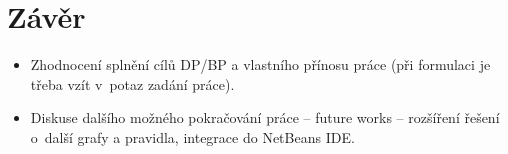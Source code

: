 \chapter{Závěr}

\begin{itemize}
\item Zhodnocení splnění cílů DP/BP a  vlastního přínosu práce (při formulaci je třeba vzít v~potaz zadání práce).
\item Diskuse dalšího možného pokračování práce -- future works -- rozšíření řešení o~další grafy a pravidla, integrace do NetBeans IDE.
\end{itemize}
